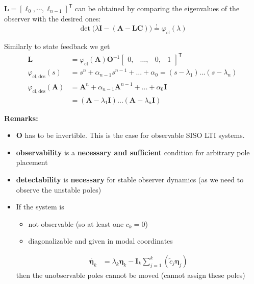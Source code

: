$\mathbf{L}={\left[\ell_0,\cdots,\ell_{n-1}\right]}^{\mathsf{T}}$ can be obtained by comparing the eigenvalues of the observer with the desired ones:
\noindent\begin{equation*}
    \det\bigl(\lambda \mathbf{I} -(\mathbf{A}-\mathbf{LC})\bigr) \overset{!}{=} \varphi_{\mathrm{cl}}(\lambda)
\end{equation*}


Similarly to state feedback we get
\begin{align*}
    \mathbf{L}                        & =\varphi_{\mathrm{cl}}(\mathbf{A})\mathbf{O}^{-1}\begin{bmatrix}
                                                                                             0, & \ldots, & 0, & 1
                                                                                         \end{bmatrix}^{\mathsf{T}} \\
    \varphi_{\mathrm{cl,des}}(s)          & =s^n+\alpha_{n-1}s^{n-1}+\ldots+\alpha_0=(s-\lambda_1)\ldots(s-\lambda_n)   \\
    \varphi_{\mathrm{cl,des}}(\mathbf{A}) & =\mathbf{A}^n+\alpha_{n-1}\mathbf{A}^{n-1}+\ldots+\alpha_0 \mathbf{I}       \\
                                      & = (\mathbf{A}-\lambda_1 \mathbf{I})\ldots(\mathbf{A}-\lambda_n \mathbf{I})
\end{align*}

\textbf{Remarks:}
\begin{itemize}
    \item $\mathbf{O}$ has to be invertible. This is the case for observable SISO LTI systems.
    \item \textbf{observability} is a \textbf{necessary and sufficient} condition for arbitrary pole placement
    \item \textbf{detectability} is \textbf{necessary} for stable observer dynamics (as we need to observe the unstable poles)
    \item If the system is
          \begin{itemize}
              \item not observable (so at least one $c_k=0$)
              \item diagonalizable and given in modal coordinates
          \end{itemize}
          \begin{align*}
              \dot{\boldsymbol{\eta}_k} & =\lambda_k\boldsymbol{\eta}_k-\mathbf{I}_k\sum_{j=1}^k\left(\tilde{c}_j \boldsymbol{\eta}_j\right)
          \end{align*}
          then the unobservable poles cannot be moved (cannot assign these poles)
\end{itemize}

